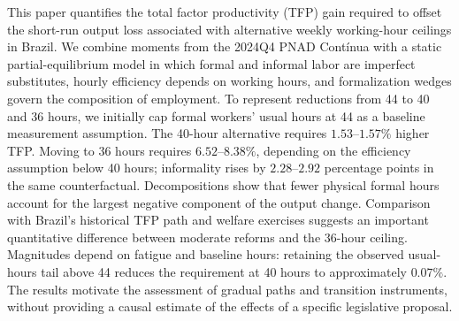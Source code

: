 This paper quantifies the total factor productivity (TFP) gain required to offset the short-run output loss associated with alternative weekly working-hour ceilings in Brazil. We combine moments from the 2024Q4 PNAD Contínua with a static partial-equilibrium model in which formal and informal labor are imperfect substitutes, hourly efficiency depends on working hours, and formalization wedges govern the composition of employment. To represent reductions from 44 to 40 and 36 hours, we initially cap formal workers' usual hours at 44 as a baseline measurement assumption. The 40-hour alternative requires $1.53$--$1.57\%$ higher TFP. Moving to 36 hours requires $6.52$--$8.38\%$, depending on the efficiency assumption below 40 hours; informality rises by $2.28$--$2.92$ percentage points in the same counterfactual. Decompositions show that fewer physical formal hours account for the largest negative component of the output change. Comparison with Brazil's historical TFP path and welfare exercises suggests an important quantitative difference between moderate reforms and the 36-hour ceiling. Magnitudes depend on fatigue and baseline hours: retaining the observed usual-hours tail above 44 reduces the requirement at 40 hours to approximately $0.07\%$. The results motivate the assessment of gradual paths and transition instruments, without providing a causal estimate of the effects of a specific legislative proposal.
